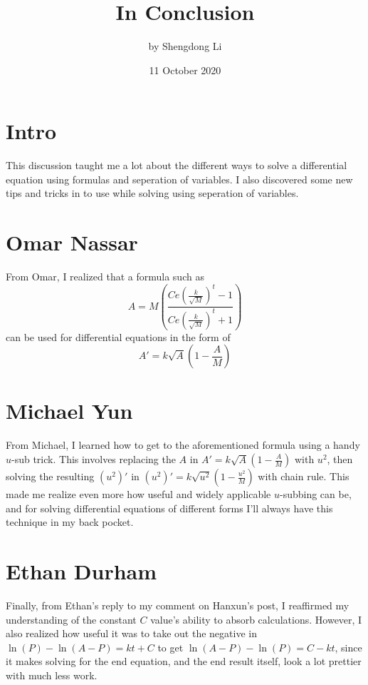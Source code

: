 \documentclass[12pt]{article}
\begin{document}
\title{In Conclusion}
\author{by Shengdong Li}
\date{11 October 2020}
\maketitle

\section{Intro}
This discussion taught me a lot about the different ways to solve a differential equation using formulas and seperation of variables. I also discovered some new tips and tricks in to use while solving using seperation of variables.

\section{Omar Nassar}
From Omar, I realized that a formula such as
$$
A=M\left(\frac{Ce\left(\frac{k}{\sqrt{M}}\right)^{t}-1}{Ce\left(\frac{k}{\sqrt{M}}\right)^{t}+1}\right)
$$
can be used for differential equations in the form of 
$$
A'=k\sqrt{A}\left(1-\frac{A}{M}\right)
$$
\section{Michael Yun}
From Michael, I learned how to get to the aforementioned formula using a handy $u$-sub trick. This involves replacing the $A$ in $A'=k\sqrt{A}\left(1-\frac{A}{M}\right)$ with $u^{2}$, then solving the resulting $\left(u^{2}\right)'$ in $\left(u^{2}\right)'=k\sqrt{u^{2}}\left(1-\frac{u^{2}}{M}\right)$ with chain rule. This made me realize even more how useful and widely applicable $u$-subbing can be, and for solving differential equations of different forms I'll always have this technique in my back pocket.
\section{Ethan Durham}
Finally, from Ethan's reply to my comment on Hanxun's post, I reaffirmed my understanding of the constant $C$ value's ability to absorb calculations. However, I also realized how useful it was to take out the negative in $\ln\left(P\right)-\ln\left(A-P\right)=kt+C$ to get $\ln\left(A-P\right)-\ln\left(P\right)=C-kt$, since it makes solving for the end equation, and the end result itself, look a lot prettier with much less work.
\end{document}
